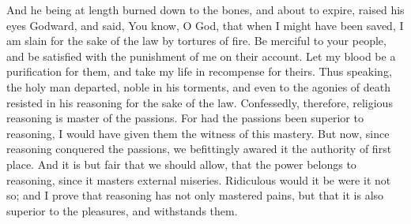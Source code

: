 {And he being at length burned down to the bones, and about to expire, raised his eyes Godward, and said,
You know, O God, that when I might have been saved, I am slain for the sake of the law by tortures of fire.
Be merciful to your people, and be satisfied with the punishment of me on their account.
Let my blood be a purification for them, and take my life in recompense for theirs.
Thus speaking, the holy man departed, noble in his torments, and even to the agonies of death resisted in his reasoning for the sake of the law.
Confessedly, therefore, religious reasoning is master of the passions.
For had the passions been superior to reasoning, I would have given them the witness of this mastery.
But now, since reasoning conquered the passions, we befittingly awared it the authority of first place.
And it is but fair that we should allow, that the power belongs to reasoning, since it masters external miseries.
Ridiculous would it be were it not so; and I prove that reasoning has not only mastered pains, but that it is also superior to the pleasures, and withstands them.

}
